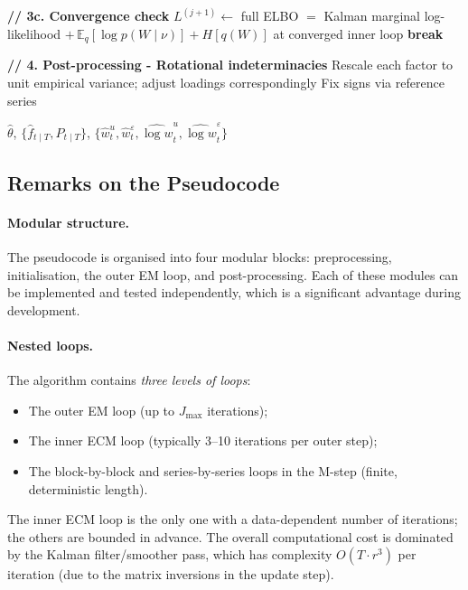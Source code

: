\documentclass[11pt, a4paper, oneside]{article}
\begin{document}
\begin{algorithm}[H]
\begin{algorithmic}[1]
\vspace{0.2em}
\State \textbf{// 3c. Convergence check}
\State $L^{(j+1)} \gets$ full ELBO $= $ Kalman marginal log-likelihood $+\, \mathbb{E}_q[\log p(W\mid\nu)] + H[q(W)]$ at converged inner loop
    \State \textbf{break}
\EndIf

\vspace{0.3em}
\State \textbf{// 4. Post-processing - Rotational indeterminacies}
\State Rescale each factor to unit empirical variance; adjust loadings correspondingly
\State Fix signs via reference series

\vspace{0.3em}
\State \Return $\hat{\theta}$, $\{\hat{f}_{t \mid T}, P_{t \mid T}\}$, $\{\hat{w}^u_t, \hat{w}^\varepsilon_t, \widehat{\log w}^u_t, \widehat{\log w}^\varepsilon_t\}$

\end{algorithmic}
\end{algorithm}

\subsection{Remarks on the Pseudocode}
\label{subsec:pseudocode-remarks}

\paragraph{Modular structure.}
The pseudocode is organised into four modular blocks: preprocessing, initialisation, the outer EM loop, and
post-processing. Each of these modules can be implemented
and tested independently, which is a significant advantage during
development.

\paragraph{Nested loops.}
The algorithm contains \emph{three levels of loops}:
\begin{itemize}[leftmargin=1.5em, itemsep=2pt]
    \item The outer EM loop (up to $J_{\max}$ iterations);
    \item The inner ECM loop (typically 3–10 iterations per outer step);
    \item The block-by-block and series-by-series loops in the M-step
          (finite, deterministic length).
\end{itemize}
The inner ECM loop is the only one with a data-dependent number of
iterations; the others are bounded in advance. The overall
computational cost is dominated by the Kalman filter/smoother pass,
which has complexity $O(T \cdot r^3)$ per iteration (due to the
matrix inversions in the update step).
\end{document}
